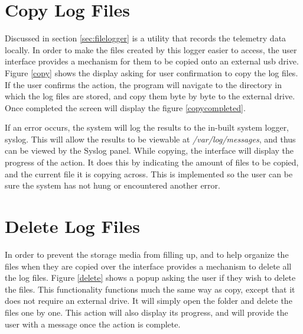 

\section{Copy Log Files}

Discussed in section \ref{sec:filelogger} is a utility that records the telemetry data locally. In order to make the files created by this logger easier to access, the user interface provides a mechanism for them to be copied onto an external usb drive. Figure \ref{copy} shows the display asking for user confirmation to copy the log files. If the user confirms the action, the program will navigate to the directory in which the log files are stored, and copy them byte by byte to the external drive. Once completed the screen will display the figure \ref{copycompleted}. 

If an error occurs, the system will log the results to the in-built system logger, syslog. This will allow the results to be viewable at \emph{/var/log/messages}, and thus can be viewed by the Syslog panel. While copying, the interface will display the progress of the action. It does this by indicating the amount of files to be copied, and the current file it is copying across. This is implemented so the user can be sure the system has not hung or encountered another error.


\section{Delete Log Files}

In order to prevent the storage media from filling up, and to help organize the files when they are copied over the interface provides a mechanism to delete all the log files. Figure \ref{delete} shows a popup asking the user if they wish to delete the files. This functionality functions much the same way as copy, except that it does not require an external drive. It will simply open the folder and delete the files one by one. This action will also display its progress, and will provide the user with a message once the action is complete.



